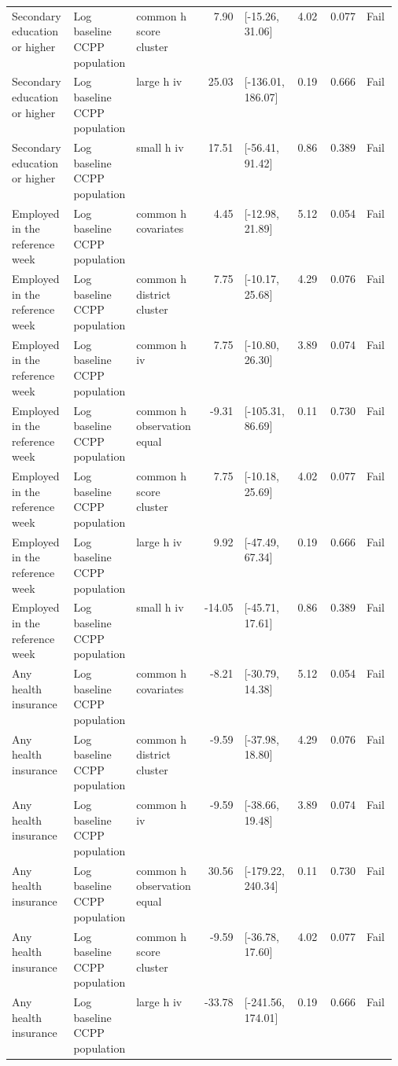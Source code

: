 \begin{longtable}{@{}p{0.16\linewidth}p{0.14\linewidth}p{0.14\linewidth}rp{0.13\linewidth}rrl@{}}
Secondary education or higher & Log baseline CCPP population & common h score cluster & 7.90 & [-15.26, 31.06] & 4.02 & 0.077 & Fail \\
Secondary education or higher & Log baseline CCPP population & large h iv & 25.03 & [-136.01, 186.07] & 0.19 & 0.666 & Fail \\
Secondary education or higher & Log baseline CCPP population & small h iv & 17.51 & [-56.41, 91.42] & 0.86 & 0.389 & Fail \\
Employed in the reference week & Log baseline CCPP population & common h covariates & 4.45 & [-12.98, 21.89] & 5.12 & 0.054 & Fail \\
Employed in the reference week & Log baseline CCPP population & common h district cluster & 7.75 & [-10.17, 25.68] & 4.29 & 0.076 & Fail \\
Employed in the reference week & Log baseline CCPP population & common h iv & 7.75 & [-10.80, 26.30] & 3.89 & 0.074 & Fail \\
Employed in the reference week & Log baseline CCPP population & common h observation equal & -9.31 & [-105.31, 86.69] & 0.11 & 0.730 & Fail \\
Employed in the reference week & Log baseline CCPP population & common h score cluster & 7.75 & [-10.18, 25.69] & 4.02 & 0.077 & Fail \\
Employed in the reference week & Log baseline CCPP population & large h iv & 9.92 & [-47.49, 67.34] & 0.19 & 0.666 & Fail \\
Employed in the reference week & Log baseline CCPP population & small h iv & -14.05 & [-45.71, 17.61] & 0.86 & 0.389 & Fail \\
Any health insurance & Log baseline CCPP population & common h covariates & -8.21 & [-30.79, 14.38] & 5.12 & 0.054 & Fail \\
Any health insurance & Log baseline CCPP population & common h district cluster & -9.59 & [-37.98, 18.80] & 4.29 & 0.076 & Fail \\
Any health insurance & Log baseline CCPP population & common h iv & -9.59 & [-38.66, 19.48] & 3.89 & 0.074 & Fail \\
Any health insurance & Log baseline CCPP population & common h observation equal & 30.56 & [-179.22, 240.34] & 0.11 & 0.730 & Fail \\
Any health insurance & Log baseline CCPP population & common h score cluster & -9.59 & [-36.78, 17.60] & 4.02 & 0.077 & Fail \\
Any health insurance & Log baseline CCPP population & large h iv & -33.78 & [-241.56, 174.01] & 0.19 & 0.666 & Fail \\

\end{longtable}
